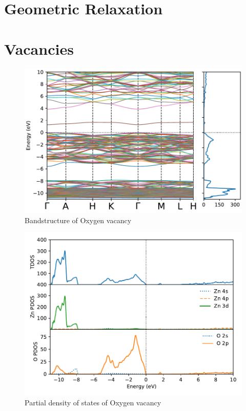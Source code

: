 \section{Geometric Relaxation}

\clearpage

\section{Vacancies}

\begin{figure}[tbh!]
	\centering
	\includegraphics[width=0.7\linewidth]{"images/rnd/band-dos_O_vac"}
	\caption[Bandstructure of Oxygen vacancy]{Bandstructure of Oxygen vacancy}
\end{figure}

\begin{figure}[tbh!]
	\centering
	\includegraphics[width=0.7\linewidth]{"images/rnd/dos-pdos_O_vac"}
	\caption[Partial density of states of Oxygen vacancy]{Partial density of states of Oxygen vacancy}
\end{figure}

\clearpage

